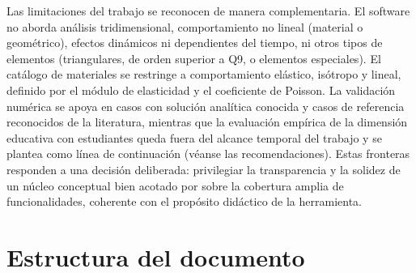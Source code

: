 Las limitaciones del trabajo se reconocen de manera complementaria. El software no aborda análisis tridimensional, comportamiento no lineal (material o geométrico), efectos dinámicos ni dependientes del tiempo, ni otros tipos de elementos (triangulares, de orden superior a Q9, o elementos especiales). El catálogo de materiales se restringe a comportamiento elástico, isótropo y lineal, definido por el módulo de elasticidad y el coeficiente de Poisson. La validación numérica se apoya en casos con solución analítica conocida y casos de referencia reconocidos de la literatura, mientras que la evaluación empírica de la dimensión educativa con estudiantes queda fuera del alcance temporal del trabajo y se plantea como línea de continuación (véanse las recomendaciones). Estas fronteras responden a una decisión deliberada: privilegiar la transparencia y la solidez de un núcleo conceptual bien acotado por sobre la cobertura amplia de funcionalidades, coherente con el propósito didáctico de la herramienta.

\section*{Estructura del documento}

